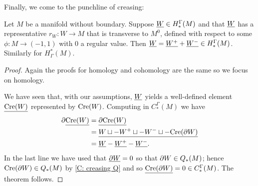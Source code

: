 Finally, we come to the punchline of creasing:

\begin{theorem}\label{T: cohomology creasing}
	Let $M$ be a manifold without boundary.
	Suppose $\underline{W} \in H_*^\Gamma(M)$ and that $\underline{W}$ has a representative $r_W \colon W \to M$ that is transverse to $M^0$, defined with respect to some $\phi \colon M \to (-1,1)$ with $0$ a regular value.
	Then $\underline{W} = \underline{W^+} + \underline{W^-} \in H_*^\Gamma(M)$.
	Similarly for $H^*_\Gamma(M)$.
\end{theorem}

\begin{proof}
	Again the proofs for homology and cohomology are the same so we focus on homology.

	We have seen that, with our assumptions, $\underline{W}$ yields a well-defined element $\underline{\mathrm{Cre}(W)}$ represented by $\mathrm{Cre}(W)$.
	Computing in $C_*^\Gamma(M)$ we have
	\begin{align*}
		\partial \underline{\mathrm{Cre}(W)}& = \underline{\partial \mathrm{Cre}(W) }\\
		& = \underline{W \sqcup -W^+ \sqcup -W^- \sqcup -\mathrm{Cre}(\partial W)}\\
		& = \underline{W} -\underline{W^+}-\underline{W^-}.
	\end{align*}
	In the last line we have used that $\underline{\partial W} = 0$ so that $\partial W \in Q_*(M)$; hence $\mathrm{Cre}(\partial W) \in Q_*(M)$ by \cref{C: creasing Q} and so $\underline{\mathrm{Cre}(\partial W)} = 0 \in C_*^\Gamma(M)$.
	The theorem follows.
\end{proof}

\begin{comment}
	Let $f \colon W \to \R$ and $p$ be a regular value of $f$.
	Define $W^+$ to be $f^{-1} [p, \infty)$ and $W^-$ to be $f^{-1} (-\infty, p]$.
	By Theorem~1 of \cite{Lipy14} (and
	also transversality as developed in in Section 6 of \cite{Joy12}), $W^+$ and $W^-$ are manifolds with corners.
	The following is Lemma~9 of \cite{Lipy14}.

	\begin{proposition}\label{P: creasing}
		Let $f \colon W \to \R$ and $p$ be a regular value of $f$.
		There is a manifold-with corners structure on the topological manifold $W \times [0,1]$, called the creasing of $W$ at $p$,
		whose boundary is the disjoint union of $W$ with its orientation
		reversed, $W^+$, $W^-$ and the creasing of ${\bd W}$ at $p$.
	\end{proposition}

	We denote the creasing of $W$ at $p$ by $\Cre(W)$, suppressing $f$ and $p$ from notation.
	See Figure~\ref{F: creasing} for a sketch of a creasing of the teardrop manifold.
\end{comment}